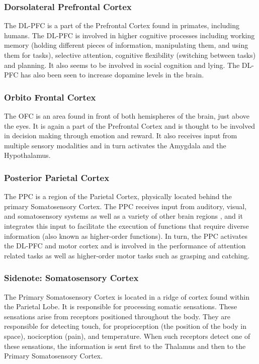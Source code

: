 \documentclass[a4paper, amsfonts, amssymb, amsmath, reprint, showkeys, nofootinbib, twoside]{revtex4-1}
\begin{document}
\subsubsection{Dorsolateral Prefrontal Cortex}

The DL-PFC is a part of the Prefrontal Cortex found in primates, including
humans. The DL-PFC is involved in higher cognitive processes including working memory
(holding different pieces of information, manipulating them, and using them for
tasks), selective attention, cognitive flexibility (switching between tasks) and
planning. It also seems to be involved in social cognition and lying. The DL-PFC has
also been seen to increase dopamine levels in the brain. \cite{dlpfcmemory,dlpfctasks,dlpfclying}

\subsubsection{Orbito Frontal Cortex}

The OFC is an area found in front of both hemispheres of the brain, just above the
eyes. It is again a part of the Prefrontal Cortex and is thought to be involved in
decision making through emotion and reward. It also receives input from multiple
sensory modalities and in turn activates the Amygdala and the
Hypothalamus. \cite{theprefrontalcortex,ofcprimates,theorbitofrontalcortex}

\subsubsection{Posterior Parietal Cortex}
The PPC is a region of the Parietal Cortex, physically located behind the primary
Somatosensory Cortex. The PPC receives input from auditory, visual, and somatosensory systems
as well as a variety of other brain regions , and it integrates this input to facilitate
the execution of functions that require diverse information (also known as higher-order functions).
In turn, the PPC activates the DL-PFC and motor cortex and is involved in the performance of
attention related tasks as well as higher-order motor tasks such as grasping and catching. \cite{parietallobesa,parietallobes}


\subsubsection{Sidenote: Somatosensory Cortex}
The Primary Somatosensory Cortex is located in a ridge of cortex found within the Parietal Lobe.
It is responsible for processing somatic sensations. These sensations arise from receptors
positioned throughout the body. They are responsible for detecting touch, for proprioception
(the position of the body in space), nociception (pain), and temperature. \cite{somato}
When such receptors detect one of these sensations, the information is sent first to
the Thalamus and then to the Primary Somatosensory Cortex.
\end{document}
